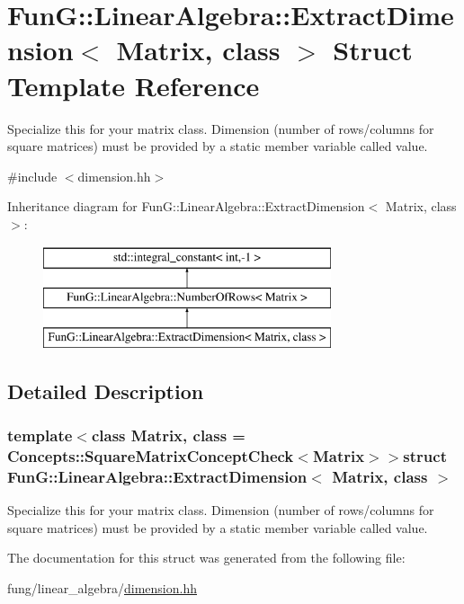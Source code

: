 \hypertarget{structFunG_1_1LinearAlgebra_1_1ExtractDimension}{\section{Fun\-G\-:\-:Linear\-Algebra\-:\-:Extract\-Dimension$<$ Matrix, class $>$ Struct Template Reference}
\label{structFunG_1_1LinearAlgebra_1_1ExtractDimension}
}


Specialize this for your matrix class. Dimension (number of rows/columns for square matrices) must be provided by a static member variable called value.  




{\ttfamily \#include $<$dimension.\-hh$>$}

Inheritance diagram for Fun\-G\-:\-:Linear\-Algebra\-:\-:Extract\-Dimension$<$ Matrix, class $>$\-:\begin{figure}[H]
\begin{center}
\leavevmode
\includegraphics[height=3.000000cm]{structFunG_1_1LinearAlgebra_1_1ExtractDimension}
\end{center}
\end{figure}


\subsection{Detailed Description}
\subsubsection*{template$<$class Matrix, class = Concepts\-::\-Square\-Matrix\-Concept\-Check$<$\-Matrix$>$$>$struct Fun\-G\-::\-Linear\-Algebra\-::\-Extract\-Dimension$<$ Matrix, class $>$}

Specialize this for your matrix class. Dimension (number of rows/columns for square matrices) must be provided by a static member variable called value. 

The documentation for this struct was generated from the following file\-:\begin{DoxyCompactItemize}
\item 
fung/linear\-\_\-algebra/\hyperlink{dimension_8hh}{dimension.\-hh}\end{DoxyCompactItemize}

